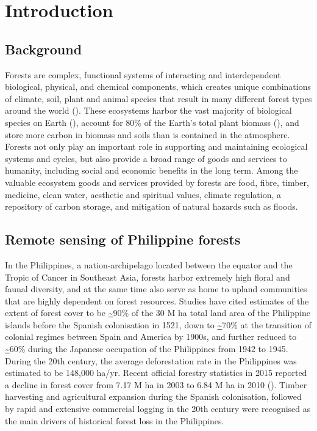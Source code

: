 
\chapter{Introduction}
\label{cha: introduction}

\section{Background}
\label{sec: intro-background}

Forests are complex, functional systems of interacting and interdependent biological, physical, and chemical components, which creates unique combinations of climate, soil, plant and animal species that result in many different forest types around the world (\cite{blanco_forest_2012}). These ecosystems harbor the vast majority of biological species on Earth (\cite{pan_structure_2013}), account for 80\% of the Earth's total plant biomass (\cite{kindermann_global_2008}), and store more carbon in biomass and soils than is contained in the atmosphere. Forests not only play an important role in supporting and maintaining ecological systems and cycles, but also provide a broad range of goods and services to humanity, including social and economic benefits in the long term. Among the valuable ecosystem goods and services provided by forests are food, fibre, timber, medicine, clean water, aesthetic and spiritual values, climate regulation, a repository of carbon storage, and mitigation of natural hazards such as floods.


\section{Remote sensing of Philippine forests}
\label{sec: intro-rs-phil-forests}

In the Philippines, a nation-archipelago located between the equator and the Tropic of Cancer in Southeast Asia, forests harbor extremely high floral and faunal diversity, and at the same time also serve as home to upland communities that are highly dependent on forest resources. Studies have cited estimates of the extent of forest cover to be \url{~}90\% of the 30 M ha total land area of the Philippine islands before the Spanish colonisation in 1521, down to \url{~}70\% at the transition of colonial regimes between Spain and America by 1900s, and further reduced to \url{~}60\% during the Japanese occupation of the Philippines from 1942 to 1945. During the 20th century, the average deforestation rate in the Philippines was estimated to be 148,000 ha/yr. Recent official forestry statistics in 2015 reported a decline in forest cover from 7.17 M ha in 2003 to 6.84 M ha in 2010 (\cite{fmb_forestry_2015}). Timber harvesting and agricultural expansion during the Spanish colonisation, followed by rapid and extensive commercial logging in the 20th century were recognised as the main drivers of historical forest loss in the Philippines.

